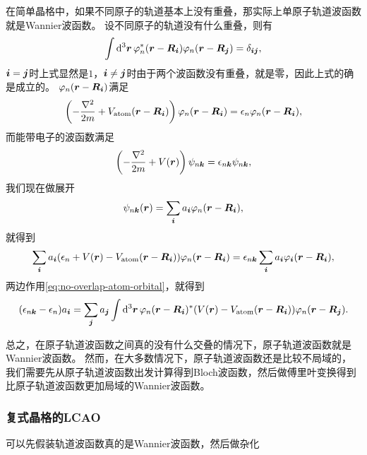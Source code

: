 在简单晶格中，如果不同原子的轨道基本上没有重叠，那实际上单原子轨道波函数就是Wannier波函数。
设不同原子的轨道没有什么重叠，则有
\begin{equation}
    \int \dd[3]{\vb*{r}} \varphi_n^*(\vb*{r} - \vb*{R}_{\vb*{i}}) \varphi_n(\vb*{r} - \vb*{R}_{\vb*{j}}) = \delta_{\vb*{i} \vb*{j}},
    \label{eq:no-overlap-atom-orbital}
\end{equation}
$\vb*{i}=\vb*{j}$时上式显然是$1$，$\vb*{i} \neq \vb*{j}$时由于两个波函数没有重叠，就是零，因此上式的确是成立的。
$\varphi_n(\vb*{r} - \vb*{R}_{\vb*{i}})$满足
\begin{equation}
    \left( - \frac{\laplacian}{2m} + V_\text{atom} (\vb*{r} - \vb*{R}_{\vb*{i}}) \right) \varphi_n(\vb*{r} - \vb*{R}_{\vb*{i}}) = \epsilon_n \varphi_n(\vb*{r} - \vb*{R}_{\vb*{i}}),
\end{equation}
而能带电子的波函数满足
\begin{equation}
    \left( - \frac{\laplacian}{2m} + V (\vb*{r}) \right) \psi_{n \vb*{k}} = \epsilon_{n \vb*{k}} \psi_{n \vb*{k}},
\end{equation}
我们现在做展开
\begin{equation}
    \psi_{n \vb*{k}}(\vb*{r}) = \sum_{\vb*{i}} a_{\vb*{i}} \varphi_n(\vb*{r} - \vb*{R}_{\vb*{i}}),
\end{equation}
就得到
\[
    \sum_{\vb*{i}} a_{\vb*{i}} (\epsilon_n + V(\vb*{r}) - V_\text{atom}(\vb*{r} - \vb*{R}_{\vb*{i}})) \varphi_n(\vb*{r} - \vb*{R}_{\vb*{i}}) = \epsilon_{n \vb*{k}} \sum_{\vb*{i}} a_{\vb*{i}} \varphi_{\vb*{i}}(\vb*{r} - \vb*{R}_{\vb*{i}}),
\]
两边作用\eqref{eq:no-overlap-atom-orbital}，就得到
\begin{equation}
    (\epsilon_{n \vb*{k}} - \epsilon_n) a_{\vb*{i}} = \sum_{\vb*{j}} a_{\vb*{j}} \int \dd[3]{\vb*{r}} \varphi_n(\vb*{r} - \vb*{R}_{\vb*{i}})^* ( V(\vb*{r}) - V_\text{atom}(\vb*{r} - \vb*{R}_{\vb*{i}})) \varphi_n(\vb*{r} - \vb*{R}_{\vb*{j}}).
\end{equation}

总之，在原子轨道波函数之间真的没有什么交叠的情况下，原子轨道波函数就是Wannier波函数。
然而，在大多数情况下，原子轨道波函数还是比较不局域的，我们需要先从原子轨道波函数出发计算得到Bloch波函数，然后做傅里叶变换得到比原子轨道波函数更加局域的Wannier波函数。

\subsubsection{复式晶格的LCAO} 

可以先假装轨道波函数真的是Wannier波函数，然后做杂化


